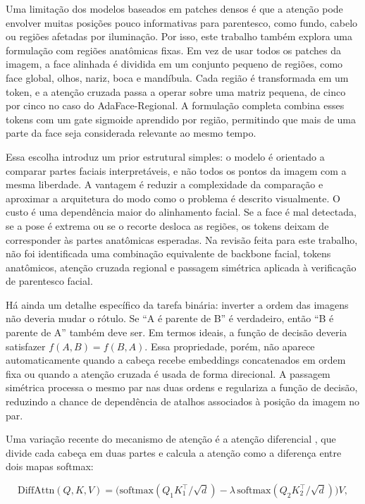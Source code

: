 Uma limitação dos modelos baseados em patches densos é que a atenção pode envolver muitas posições pouco informativas para parentesco, como fundo, cabelo ou regiões afetadas por iluminação. Por isso, este trabalho também explora uma formulação com regiões anatômicas fixas. Em vez de usar todos os patches da imagem, a face alinhada é dividida em um conjunto pequeno de regiões, como face global, olhos, nariz, boca e mandíbula. Cada região é transformada em um token, e a atenção cruzada passa a operar sobre uma matriz pequena, de cinco por cinco no caso do AdaFace-Regional. A formulação completa combina esses tokens com um gate sigmoide aprendido por região, permitindo que mais de uma parte da face seja considerada relevante ao mesmo tempo.

Essa escolha introduz um prior estrutural simples: o modelo é orientado a comparar partes faciais interpretáveis, e não todos os pontos da imagem com a mesma liberdade. A vantagem é reduzir a complexidade da comparação e aproximar a arquitetura do modo como o problema é descrito visualmente. O custo é uma dependência maior do alinhamento facial. Se a face é mal detectada, se a pose é extrema ou se o recorte desloca as regiões, os tokens deixam de corresponder às partes anatômicas esperadas. Na revisão feita para este trabalho, não foi identificada uma combinação equivalente de backbone facial, tokens anatômicos, atenção cruzada regional e passagem simétrica aplicada à verificação de parentesco facial.

Há ainda um detalhe específico da tarefa binária: inverter a ordem das imagens não deveria mudar o rótulo. Se ``A é parente de B'' é verdadeiro, então ``B é parente de A'' também deve ser. Em termos ideais, a função de decisão deveria satisfazer $f(A,B) = f(B,A)$. Essa propriedade, porém, não aparece automaticamente quando a cabeça recebe embeddings concatenados em ordem fixa ou quando a atenção cruzada é usada de forma direcional. A passagem simétrica processa o mesmo par nas duas ordens e regulariza a função de decisão, reduzindo a chance de dependência de atalhos associados à posição da imagem no par.

Uma variação recente do mecanismo de atenção é a atenção diferencial \cite{ye2024differential},
que divide cada cabeça em duas partes e calcula a atenção como a diferença entre dois mapas softmax:

\begin{equation}
\text{DiffAttn}(Q, K, V) = \big( \mathrm{softmax}(Q_1 K_1^\top / \sqrt{d}) - \lambda \, \mathrm{softmax}(Q_2 K_2^\top / \sqrt{d}) \big) V,
\label{eq:diff_attn}
\end{equation}

